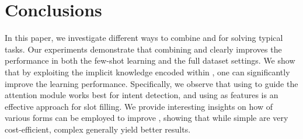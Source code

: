 \section{Conclusions}
In this paper, we investigate different ways to combine \NNs and \REs for solving typical \SLU tasks. Our experiments demonstrate that
combining \NNs and \REs clearly improves the \NN performance in both the few-shot learning and the  full dataset settings. We show that by
exploiting the implicit knowledge encoded within \REs, one can significantly improve the learning performance. Specifically, we observe
that using \REs to guide the attention module works best for intent detection, and using \REtags as features is an effective approach for
slot filling. We provide interesting insights on how \REs of various forms can be employed to improve \NNs, showing that while simple \REs are very cost-efficient, complex \REs generally yield better results.
